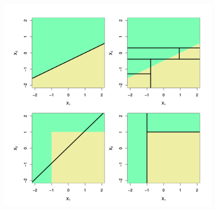 \documentclass[
  shownotes,
  xcolor={svgnames},
  hyperref={colorlinks,citecolor=DarkBlue,linkcolor=DarkRed,urlcolor=DarkBlue}
  ]{beamer}
\begin{document}
\begin{frame}[fragile]
\begin{columns}[T]
\begin{column}{.48\textwidth}
 \begin{figure}[H] \centering
            \captionsetup{justification=centering}
              \includegraphics[scale=0.55]{figures/tree_vs_reg}
 \end{figure}

\end{column}
\end{columns}




\end{frame}
\end{document}
